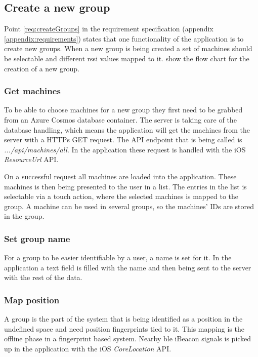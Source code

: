 \subsection{Create a new group}\label{sec:implAppNewGroup}
Point \ref{req:createGroups} in the requirement specification (appendix \ref{appendix:requirements}) states that one functionality of the application is to create new groups.
When a new group is being created a set of machines should be selectable and different \acrfull{rssi} values mapped to it.
 show the flow chart for the creation of a new group.



\subsubsection{Get machines}\label{sec:implAppNewGroupGetMachines}
To be able to choose machines for a new group they first need to be grabbed from an Azure Cosmos database container.
The server is taking care of the database handling, which means the application will get the machines from the server with a HTTPs GET request.
The API endpoint that is being called is \textit{.../api/machines/all}.
In the application these request is handled with the iOS \textit{ResourceUrl} API.

\bigskip

On a successful request all machines are loaded into the application.
These machines is then being presented to the user in a list.
The entries in the list is selectable via a touch action, where the selected machines is mapped to the group.
A machine can be used in several groups, so the machines' IDs are stored in the group. 


\subsubsection{Set group name}\label{sec:implAppNewGroupSetName}
For a group to be easier identifiable by a user, a name is set for it.
In the application a text field is filled with the name and then being sent to the server with the rest of the data.


\subsubsection{Map position}\label{sec:implAppNewGroupMapPos}
A group is the part of the system that is being identified as a position in the undefined space and need position fingerprints tied to it.
This mapping is the offline phase in a fingerprint based system.
Nearby \acrfull{ble} iBeacon signals is picked up in the application with the iOS \textit{CoreLocation} API.


